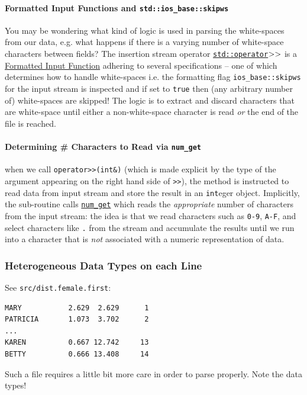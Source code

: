 \documentclass[12pt,letterpaper,twoside]{article}
\begin{document}
\paragraph{Formatted Input Functions and \texttt{std::ios\_base::skipws}} 
You may be wondering what kind of logic is used in 
parsing the white-spaces from our data, e.g. what happens if there is a varying number of 
white-space characters between fields? The insertion stream operator 
\href{https://en.cppreference.com/w/cpp/io/basic_istream/operator_gtgt}
{\texttt{std::operator$>\vspace{-1pt}>$}} is a \href{https://en.cppreference.com/w/cpp/named_req/FormattedInputFunction}{Formatted Input Function} adhering to several specifications -- one of which determines how to handle white-spaces i.e. the formatting flag 
\texttt{ios\_base::skipws} for the input stream is inspected and if set to \texttt{true} 
then (any arbitrary number of) white-spaces are skipped! The logic is to extract and 
discard characters that are 
white-space until either a non-white-space character is read \emph{or} the end of the 
file is reached.

\paragraph{Determining \# Characters to Read via \texttt{num\_get}}
when we call \texttt{operator>>(int\&)} (which is made explicit by the type of the argument appearing on the right hand side of \texttt{>>}), 
the method is instructed to read data
from input stream and store the result in an \texttt{int}eger object. Implicitly, the 
sub-routine calls \href{https://en.cppreference.com/w/cpp/locale/num_get/get}
{\texttt{num\_get}} which reads the \emph{appropriate} number of characters from the input 
stream: the idea is that we read characters such as \texttt{0-9}, \texttt{A-F}, and select characters like \texttt{.} from the stream and 
accumulate the results until we run into a character that is \emph{not} associated with
a numeric representation of data.

\subsubsection{Heterogeneous Data Types on each Line}
See \texttt{src/dist.female.first}:

\begin{verbatim}
MARY           2.629  2.629      1
PATRICIA       1.073  3.702      2
...
KAREN          0.667 12.742     13
BETTY          0.666 13.408     14
\end{verbatim}
Such a file requires a little bit more care in order to parse properly. Note the data types!
\end{document}
